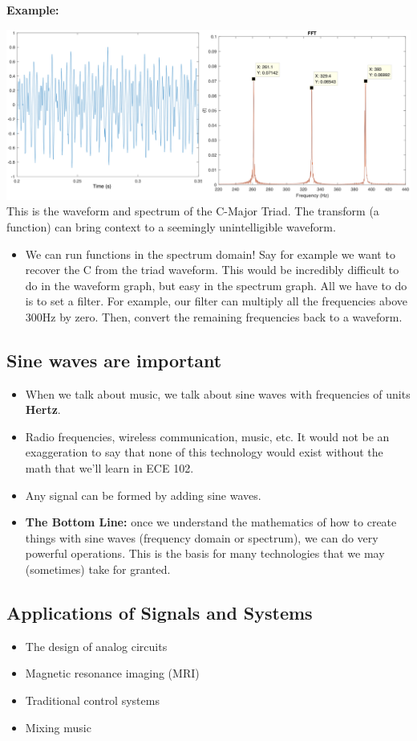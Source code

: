 \documentclass[10pt]{article}
\newcommand{\example}{\textbf{Example: }}
\begin{document}
\example
\begin{center}
\includegraphics[scale=0.6]{W1_2.png}\\
This is the waveform and spectrum of the C-Major Triad.  The transform (a function) can bring context to a seemingly unintelligible waveform.
\end{center}
\begin{itemize}
    \item We can run functions in the spectrum domain!  Say for example we want to recover the C from the triad waveform.  This would be incredibly difficult to do in the waveform graph, but easy in the spectrum graph.  All we have to do is to set a filter.  For example, our filter can multiply all the frequencies above 300Hz by zero.  Then, convert the remaining frequencies back to a waveform.
\end{itemize}
\subsection*{Sine waves are important}
\begin{itemize}
    \item When we talk about music, we talk about sine waves with frequencies of units \textbf{Hertz}.
    \item Radio frequencies, wireless communication, music, etc.  It would not be an exaggeration to say that none of this technology would exist without the math that we'll learn in ECE 102.  
    \item Any signal can be formed by adding sine waves.
    \item \textbf{The Bottom Line:} once we understand the mathematics of how to create things with sine waves (frequency domain or spectrum), we can do very powerful operations.  This is the basis for many technologies that we may (sometimes) take for granted.
\end{itemize}
\subsection*{Applications of Signals and Systems}
\begin{itemize}
    \item The design of analog circuits
    \item Magnetic resonance imaging (MRI)
    \item Traditional control systems
    \item Mixing music
\end{itemize}
\end{document}
